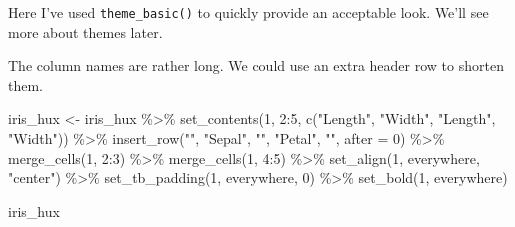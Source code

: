\documentclass[
]{article}
\newenvironment{Shaded}{\begin{snugshade}}{\end{snugshade}}
\newcommand{\AttributeTok}[1]{\textcolor[rgb]{0.77,0.63,0.00}{#1}}
\newcommand{\DecValTok}[1]{\textcolor[rgb]{0.00,0.00,0.81}{#1}}
\newcommand{\FunctionTok}[1]{\textcolor[rgb]{0.00,0.00,0.00}{#1}}
\newcommand{\NormalTok}[1]{#1}
\newcommand{\OtherTok}[1]{\textcolor[rgb]{0.56,0.35,0.01}{#1}}
\newcommand{\SpecialCharTok}[1]{\textcolor[rgb]{0.00,0.00,0.00}{#1}}
\newcommand{\StringTok}[1]{\textcolor[rgb]{0.31,0.60,0.02}{#1}}
\begin{document}
\FloatBarrier

Here I've used \texttt{theme\_basic()} to quickly provide an acceptable
look. We'll see more about themes later.

The column names are rather long. We could use an extra header row to
shorten them.

\begin{Shaded}
\begin{Highlighting}[]
\NormalTok{iris\_hux }\OtherTok{\textless{}{-}}\NormalTok{ iris\_hux }\SpecialCharTok{\%\textgreater{}\%} 
  \FunctionTok{set\_contents}\NormalTok{(}\DecValTok{1}\NormalTok{, }\DecValTok{2}\SpecialCharTok{:}\DecValTok{5}\NormalTok{, }\FunctionTok{c}\NormalTok{(}\StringTok{"Length"}\NormalTok{, }\StringTok{"Width"}\NormalTok{, }\StringTok{"Length"}\NormalTok{, }\StringTok{"Width"}\NormalTok{)) }\SpecialCharTok{\%\textgreater{}\%} 
  \FunctionTok{insert\_row}\NormalTok{(}\StringTok{""}\NormalTok{, }\StringTok{"Sepal"}\NormalTok{, }\StringTok{""}\NormalTok{, }\StringTok{"Petal"}\NormalTok{, }\StringTok{""}\NormalTok{, }\AttributeTok{after =} \DecValTok{0}\NormalTok{) }\SpecialCharTok{\%\textgreater{}\%} 
  \FunctionTok{merge\_cells}\NormalTok{(}\DecValTok{1}\NormalTok{, }\DecValTok{2}\SpecialCharTok{:}\DecValTok{3}\NormalTok{) }\SpecialCharTok{\%\textgreater{}\%} 
  \FunctionTok{merge\_cells}\NormalTok{(}\DecValTok{1}\NormalTok{, }\DecValTok{4}\SpecialCharTok{:}\DecValTok{5}\NormalTok{) }\SpecialCharTok{\%\textgreater{}\%} 
  \FunctionTok{set\_align}\NormalTok{(}\DecValTok{1}\NormalTok{, everywhere, }\StringTok{"center"}\NormalTok{) }\SpecialCharTok{\%\textgreater{}\%} 
  \FunctionTok{set\_tb\_padding}\NormalTok{(}\DecValTok{1}\NormalTok{, everywhere, }\DecValTok{0}\NormalTok{) }\SpecialCharTok{\%\textgreater{}\%} 
  \FunctionTok{set\_bold}\NormalTok{(}\DecValTok{1}\NormalTok{, everywhere)}
  
\NormalTok{iris\_hux}
\end{Highlighting}
\end{Shaded}

 
  \providecommand{\huxb}[2]{\arrayrulecolor[RGB]{#1}\global\arrayrulewidth=#2pt}
  \providecommand{\huxvb}[2]{\color[RGB]{#1}\vrule width #2pt}
  \providecommand{\huxtpad}[1]{\rule{0pt}{#1}}
  \providecommand{\huxbpad}[1]{\rule[-#1]{0pt}{#1}}
\end{document}
